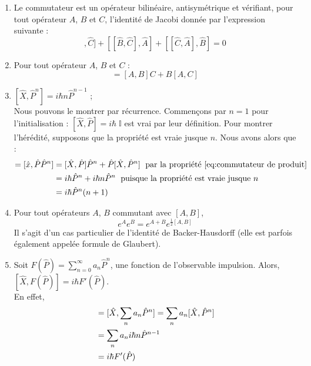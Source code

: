 \documentclass{article}
\begin{document}
\begin{enumerate}
    \item Le commutateur est un opérateur bilinéaire, antisymétrique et vérifiant, pour tout opérateur $A$, $B$ et $C$, l'identité de Jacobi donnée par l'expression suivante :
	\begin{equation}
		[[\hat{A},\hat{B}],\hat{C}] + [[\hat{B},\hat{C}],\hat{A}] + [[\hat{C},\hat{A}],\hat{B}] = 0
	\end{equation}
    \item Pour tout opérateur $A$, $B$ et $C$ : 
    \begin{equation}
        [A,BC] = [A,B]C + B[A,C]
        \label{eq:commutateur de produit}
    \end{equation}
    \item $[\hat{X}, \hat{P}^n] = i\hbar n\hat{P}^{n-1}$ ; \\
    Nous pouvons le montrer par récurrence. Commençons par $n=1$ pour l'initialisation : $[\hat{X}, \hat{P}] = i\hbar \; \mathbb{I}$ est vrai par leur définition. Pour montrer l'hérédité, supposons que la propriété est vraie jusque $n$. Nous avons alors que :
    \begin{align} [\hat{X}, \hat{P}^{n+1}] = [\hat{x}, \hat{P}\hat{P}^n] &= [\hat{X}, \hat{P}]\hat{P}^n + \hat{P}[\hat{X}, \hat{P}^n] \; \mbox{ par la propriété \eqref{eq:commutateur de produit}} \notag \\
        &= i\hbar \hat{P}^n + i\hbar n \hat{P}^n \; \mbox{ puisque la propriété est vraie jusque $n$} \notag \\
        &= i\hbar \hat{P}^n (n+1)
    \end{align}
    \item Pour tout opérateurs $A$, $B$ commutant avec $[A,B]$, 
    	\begin{equation}
            e^A e^B = e^{A+B}e^{\frac{1}{2} [A,B]}
    	\end{equation}
    Il s'agit d'un cas particulier de l'identité de Backer-Hausdorff (elle est parfois également appelée formule de Glaubert).
    \item Soit $F(\hat{P}) = \sum_{n=0}^\infty a_n \hat{P}^n$, une fonction de l'observable impulsion. Alors, $[\hat{X}, F(\hat{P})] = i\hbar F'(\hat{P})$. \\
    En effet, \begin{align}
        [\hat{X}, F(\hat{P})] &= [\hat{X}, \sum_n a_n \hat{P}^n] = \sum_n a_n[\hat{X}, \hat{P}^n] \notag \\
        &= \sum_n a_n i\hbar n \hat{P}^{n-1} \notag \\
        &= i\hbar F'(\hat{P}) \label{commutateur d'une fonction de P}
    \end{align}
\end{enumerate}
\end{document}
